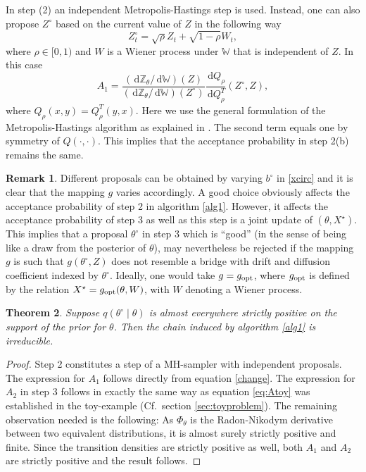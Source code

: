 \documentclass[preprint]{imsart}
\renewcommand{\th}{\theta}
\newcommand{\bb}[1]{\mathbb{#1}}
\newtheorem{thm}{Theorem}[section]
\theoremstyle{definition}
\newtheorem{rem}[thm]{Remark}
\newcommand{\dd}{{\,\mathrm d}}
\begin{document}
In step (2) an independent Metropolis-Hastings step is used. Instead, one can also propose $Z^\circ$ based on the current value of $Z$ in the following way
\begin{equation}\label{eq:rw-innovation} Z^\circ_t = \sqrt{\rho} Z_t + \sqrt{1-\rho} W_t, \end{equation}
where $\rho\in [0,1)$ and $W$ is a Wiener process  under $\bb{W}$ that is independent of $Z$.
In this case 
\[ A_1 = \frac{\left(\!\dd \bb{Z}_\th \big/\!\dd\bb{W}\right) (Z)}{\left(\!\dd \bb{Z}_\th \big/\! \dd \bb{W}\right) (Z^\circ)}
\frac{\dd Q_\rho}{\dd Q^T_\rho}(Z^\circ, Z), \]
where $Q_\rho(x,y)=Q_\rho^T(y,x)$. Here we use the general formulation of the Metropolis-Hastings algorithm as explained in \cite{tierneyAnnapl}.  The second term equals one by symmetry of $Q(\cdot, \cdot)$. 
This implies that the acceptance probability in step 2(b) remains the same. 

\begin{rem}
Different proposals can be obtained by varying $b^\circ$ in \eqref{xcirc} and it   is clear that  the mapping $g$ varies accordingly. A good choice obviously affects the acceptance probability of step 2 in algorithm \ref{alg1}. However, it affects the acceptance probability of step 3 as well as this step is a joint update of $(\th, X^\star)$. This implies that a proposal $\th^\circ$ in step 3 which is ``good'' (in the sense of being like a draw from the posterior of $\th$), may nevertheless be rejected if the mapping $g$ is such that  $g(\th^\circ, Z)$ does not resemble a bridge with drift and diffusion coefficient indexed by $\th^\circ$.   Ideally, one would take $g=g_{\rm opt}$, where $g_{\rm opt}$ is defined by the relation $X^\star = g_{\text{\rm opt}}(\th, W)$, with $W$ denoting a Wiener process.
\end{rem}


\begin{thm}\label{lem:irreducible}
Suppose $q(\th^\circ \mid \th)$ is almost everywhere strictly positive on the support  of the prior for $\th$. Then the chain induced by  algorithm \ref{alg1} is irreducible.
\end{thm}

\begin{proof}
Step 2 constitutes a step of a MH-sampler with independent proposals. The expression for $A_1$ follows directly from equation \eqref{change}. The expression for $A_2$  in step 3 follows in exactly the same way as equation \eqref{eq:Atoy} was established in the toy-example (Cf.\ section \ref{sec:toyproblem}). 
 The remaining observation needed is the following: 
As $\Phi_\th$ is the Radon-Nikodym derivative between two equivalent distributions, it is almost surely strictly positive and finite. Since the transition densities are strictly positive as well,  both $A_1$ and $A_2$ are strictly positive and the result follows.
\end{proof}
\end{document}
